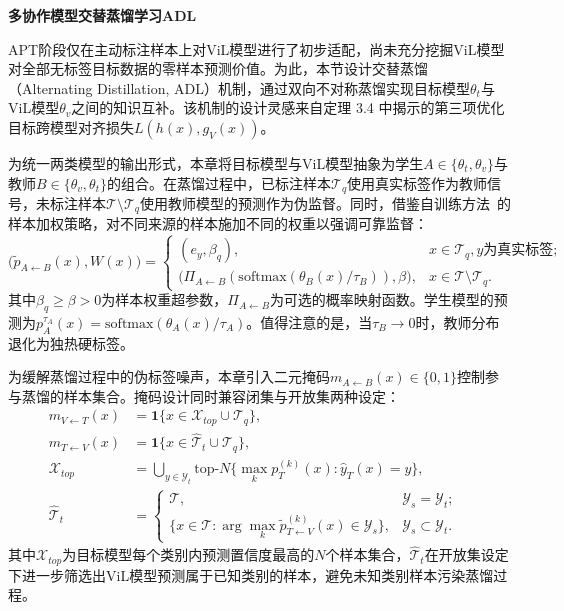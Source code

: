 \noindent\textbf{多协作模型交替蒸馏学习ADL}

APT阶段仅在主动标注样本上对ViL模型进行了初步适配，尚未充分挖掘ViL模型对全部无标签目标数据的零样本预测价值。为此，本节设计交替蒸馏（Alternating Distillation, ADL）机制，通过双向不对称蒸馏实现目标模型$\theta_t$与ViL模型$\theta_v$之间的知识互补。该机制的设计灵感来自定理 3.4 中揭示的第三项优化目标跨模型对齐损失$L(h(x),g_V(x))$。

为统一两类模型的输出形式，本章将目标模型与ViL模型抽象为学生$A\in\{\theta_t,\theta_v\}$与教师$B\in\{\theta_v,\theta_t\}$的组合。在蒸馏过程中，已标注样本$\mathcal{T}_q$使用真实标签作为教师信号，未标注样本$\mathcal{T}\setminus\mathcal{T}_q$使用教师模型的预测作为伪监督。同时，借鉴自训练方法~\cite{liang2021source}的样本加权策略，对不同来源的样本施加不同的权重以强调可靠监督：
\begin{equation}
\big(\tilde{p}_{A\leftarrow B}(x), W(x)\big) =
\begin{cases}
(e_y, \beta_q), & x\in\mathcal{T}_q, y\text{为真实标签};\\
\big(\Pi_{A\leftarrow B}(\mathrm{softmax}(\theta_B(x)/\tau_B)), \beta\big), & x\in\mathcal{T}\setminus\mathcal{T}_q.
\end{cases}
\label{eq:teacher_dist}
\end{equation}
其中$\beta_q\geq\beta>0$为样本权重超参数，$\Pi_{A\leftarrow B}$为可选的概率映射函数。学生模型的预测为$p_A^{\tau_A}(x)=\mathrm{softmax}(\theta_A(x)/\tau_A)$。值得注意的是，当$\tau_B\to 0$时，教师分布退化为独热硬标签。

为缓解蒸馏过程中的伪标签噪声，本章引入二元掩码$m_{A\leftarrow B}(x)\in\{0,1\}$控制参与蒸馏的样本集合。掩码设计同时兼容闭集与开放集两种设定：
\begin{align}
m_{V\leftarrow T}(x) &= \mathbf{1}\{x\in\mathcal{X}_{top}\cup\mathcal{T}_q\}, &\\
m_{T\leftarrow V}(x) &= \mathbf{1}\{x\in\hat{\mathcal{T}}_t\cup\mathcal{T}_q\}, &\\[3pt]
\mathcal{X}_{top} &= \bigcup_{y\in\mathcal{Y}_t}\mathrm{top}\text{-}N\big\{\max_k p_T^{(k)}(x) : \hat{y}_T(x)=y\big\}, \label{eq:topX} &\\[3pt]
\hat{\mathcal{T}}_t &=
\begin{cases}
\mathcal{T}, & \mathcal{Y}_s=\mathcal{Y}_t;\\
\{x\in\mathcal{T}: \arg\max_k\tilde{p}_{T\leftarrow V}^{(k)}(x)\in\mathcal{Y}_s\}, & \mathcal{Y}_s\subset\mathcal{Y}_t.
\end{cases}
\end{align}
其中$\mathcal{X}_{top}$为目标模型每个类别内预测置信度最高的$N$个样本集合，$\hat{\mathcal{T}}_t$在开放集设定下进一步筛选出ViL模型预测属于已知类别的样本，避免未知类别样本污染蒸馏过程。

